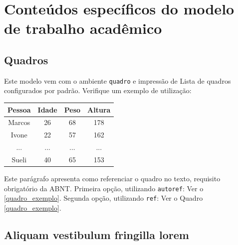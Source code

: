 

\chapter{Conteúdos específicos do modelo de trabalho acadêmico}\label{cap_trabalho_academico}

\section{Quadros}

Este modelo vem com o ambiente \texttt{quadro} e impressão de Lista de quadros 
configurados por padrão. Verifique um exemplo de utilização:

\begin{quadro}[htb]
\caption{\label{quadro_exemplo}Exemplo de quadro}
\begin{tabular}{|c|c|c|c|}
	\hline
	\textbf{Pessoa} & \textbf{Idade} & \textbf{Peso} & \textbf{Altura} \\ \hline
	Marcos & 26    & 68   & 178    \\ \hline
	Ivone  & 22    & 57   & 162    \\ \hline
	...    & ...   & ...  & ...    \\ \hline
	Sueli  & 40    & 65   & 153    \\ \hline
\end{tabular}
\end{quadro}

Este parágrafo apresenta como referenciar o quadro no texto, requisito
obrigatório da ABNT. 
Primeira opção, utilizando \texttt{autoref}: Ver o \autoref{quadro_exemplo}. 
Segunda opção, utilizando  \texttt{ref}: Ver o Quadro \ref{quadro_exemplo}.

\section{Aliquam vestibulum fringilla lorem}

\lipsum[1-3]
